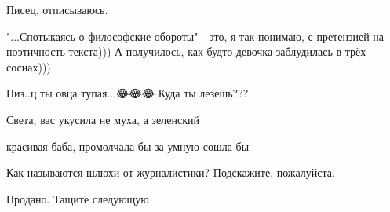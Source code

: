 \begin{itemize}
 
Писец, отписываюсь.

 
"...Спотыкаясь о философские обороты" - это, я так понимаю, с претензией на поэтичность текста))) А получилось, как будто девочка заблудилась в трёх соснах)))

 
Пиз..ц ты овца тупая...😂😂😂 Куда ты лезешь???

 
Света, вас укусила не муха, а зеленский

 
красивая баба, промолчала бы за умную сошла бы

 
Как называются шлюхи от журналистики? Подскажите, пожалуйста.

 
Продано.
Тащите следующую

 


\end{itemize}
